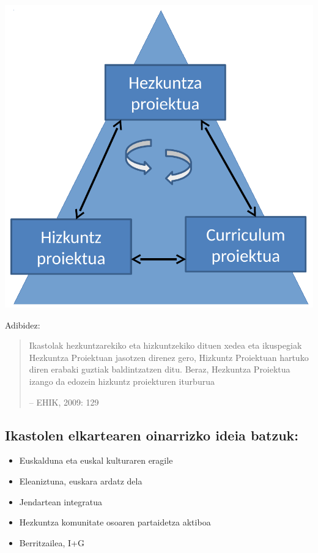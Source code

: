 \documentclass[
]{book}
\providecommand{\tightlist}{%
  \setlength{\itemsep}{0pt}\setlength{\parskip}{0pt}}
\begin{document}
\includegraphics{assets/3-img01.png}

Adibidez:

\begin{quote}
Ikastolak hezkuntzarekiko eta hizkuntzekiko dituen xedea eta ikuspegiak Hezkuntza Proiektuan jasotzen direnez gero, Hizkuntz Proiektuan hartuko diren erabaki guztiak baldintzatzen ditu. Beraz, Hezkuntza Proiektua izango da edozein hizkuntz proiekturen iturburua

-- EHIK, 2009: 129
\end{quote}

\hypertarget{ikastolen-elkartearen-oinarrizko-ideia-batzuk}{%
\subsection{Ikastolen elkartearen oinarrizko ideia batzuk:}\label{ikastolen-elkartearen-oinarrizko-ideia-batzuk}}

\begin{itemize}
\tightlist
\item
  Euskalduna eta euskal kulturaren eragile
\item
  Eleaniztuna, euskara ardatz dela
\item
  Jendartean integratua
\item
  Hezkuntza komunitate osoaren partaidetza aktiboa
\item
  Berritzailea, I+G
\end{itemize}
\end{document}
